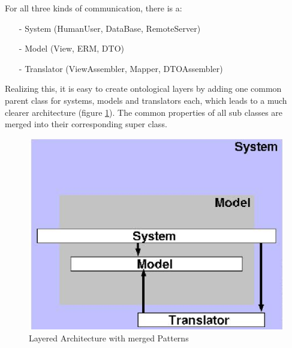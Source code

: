 For all three kinds of communication, there is a:
\begin{itemize}
    \item[-] System (HumanUser, DataBase, RemoteServer)
    \item[-] Model (View, ERM, DTO)
    \item[-] Translator (ViewAssembler, Mapper, DTOAssembler)
\end{itemize}

Realizing this, it is easy to create ontological layers by adding one common
parent class for systems, models and translators each, which leads to a much
clearer architecture (figure \ref{layered_architecture_with_merged_patterns_figure}).
The common properties of all sub classes are merged into their corresponding super
class.

\begin{figure}[ht]
    \begin{center}
        \includegraphics[scale=0.3]{vector/layered_architecture_with_merged_patterns.eps}
        \caption{Layered Architecture with merged Patterns}
        \label{layered_architecture_with_merged_patterns_figure}
    \end{center}
\end{figure}

